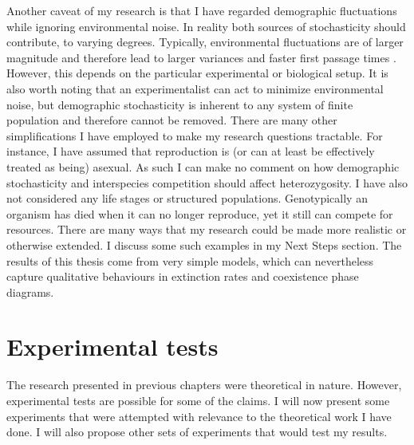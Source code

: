Another caveat of my research is that I have regarded demographic fluctuations while ignoring environmental noise. 
In reality both sources of stochasticity should contribute, to varying degrees. 
Typically, environmental fluctuations are of larger magnitude and therefore lead to larger variances and faster first passage times \cite{Ovaskainen2010}. 
However, this depends on the particular experimental or biological setup. 
It is also worth noting that an experimentalist can act to minimize environmental noise, but demographic stochasticity is inherent to any system of finite population and therefore cannot be removed. 
There are many other simplifications I have employed to make my research questions tractable. 
For instance, I have assumed that reproduction is (or can at least be effectively treated as being) asexual. 
As such I can make no comment on how demographic stochasticity and interspecies competition should affect heterozygosity. 
I have also not considered any life stages or structured populations. 
Genotypically an organism has died when it can no longer reproduce, yet it still can compete for resources. 
There are many ways that my research could be made more realistic or otherwise extended. 
I discuss some such examples in my Next Steps section. 
The results of this thesis come from very simple models, which can nevertheless capture qualitative behaviours in extinction rates and coexistence phase diagrams. 


\section{Experimental tests}

The research presented in previous chapters were theoretical in nature. 
However, experimental tests are possible for some of the claims. 
I will now present some experiments that were attempted with relevance to the theoretical work I have done. 
I will also propose other sets of experiments that would test my results. 

